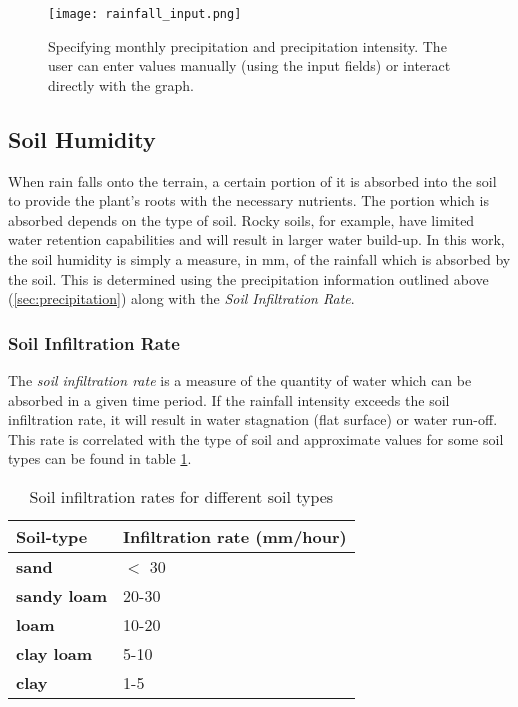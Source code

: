 \begin{figure}
\center
	\texttt{[image: rainfall\_input.png]}
	\caption{ Specifying monthly precipitation and precipitation intensity. The user can enter values manually (using the input fields) or interact directly with the graph.}
	\label{fig:rainfall_input}
\end{figure}

\subsection{Soil Humidity}

When rain falls onto the terrain, a certain portion of it is absorbed into the soil to provide the plant's roots with the necessary nutrients. The portion which is absorbed depends on the type of soil. Rocky soils, for example, have limited water retention capabilities and will result in larger water build-up. In this work, the soil humidity is simply a measure, in mm, of the rainfall which is absorbed by the soil. This is determined using the precipitation information outlined above (\ref{sec:precipitation}) along with the \textit{Soil Infiltration Rate}.

\subsubsection{Soil Infiltration Rate}\label{subsubsec:soil_infiltration_rate}

The \textit{soil infiltration rate} is a measure of the quantity of water which can be absorbed in a given time period. If the rainfall intensity exceeds the soil infiltration rate, it will result in water stagnation (flat surface) or water run-off. This rate is correlated with the type of soil and approximate values for some soil types can be found in table \ref{tab:control_types}.

\begin{table}[h]
  \centering
	    \begin{tabular}{|p{5cm}|p{8cm}|}
  	    \hline	
  	    \textbf{Soil-type} & \textbf{Infiltration rate (mm/hour)} \\
		\hline
		\textbf{sand} & $<$ 30 \\
		\hline
		\textbf{sandy loam} & 20-30 \\
		\hline
		\textbf{loam} & 10-20 \\
		\hline
		\textbf{clay loam} & 5-10 \\
		\hline
		\textbf{clay} & 1-5 \\
		\hline
		\end{tabular}
		\caption{Soil infiltration rates for different soil types \protect\footnotemark}
	  \label{tab:control_types}
\end{table}



